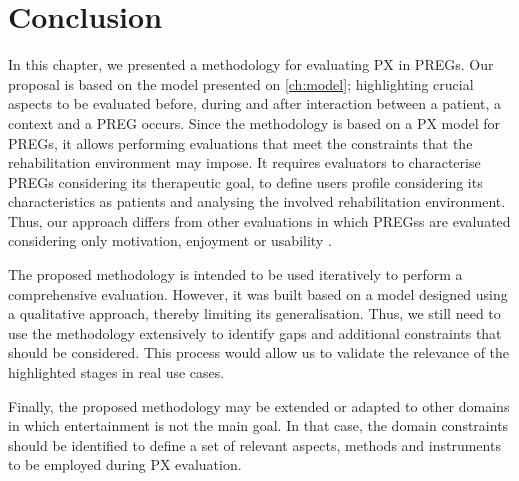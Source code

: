 \section{Conclusion}
In this chapter, we presented a methodology for evaluating PX in \acp{PREG}. Our proposal is based on the model presented on \autoref{ch:model}; highlighting crucial aspects to be evaluated before, during and after interaction between a patient, a context and a \ac{PREG} occurs. Since the methodology is based on a \ac{PX} model for \acp{PREG}, it allows performing evaluations that meet the constraints that the rehabilitation environment may impose. It requires evaluators to characterise \acp{PREG} considering its therapeutic goal, to define users profile considering its characteristics as patients and analysing the involved rehabilitation environment. Thus, our approach differs from other evaluations in which \acp{PREG}s are evaluated considering only motivation, enjoyment or usability \autocite{Brokaw2015,Burke2009,Cameirao2010,jansen2013serious,Ni2014}.

The proposed methodology is intended to be used iteratively to perform a comprehensive evaluation. However, it was built based on a model designed using a qualitative approach, thereby limiting its generalisation. Thus, we still need to use the methodology extensively to identify gaps and additional constraints that should be considered. This process would allow us to validate the relevance of the highlighted stages in real use cases.

Finally, the proposed methodology may be extended or adapted to other domains in which entertainment is not the main goal. In that case, the domain constraints should be identified to define a set of relevant aspects, methods and instruments to be employed during \ac{PX} evaluation.
